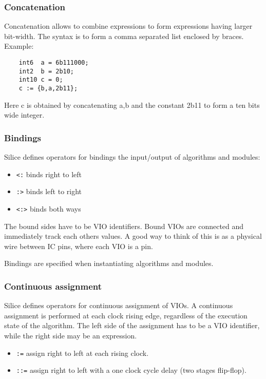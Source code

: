 \documentclass[a4]{article}
\newcommand\todo[1]{{\color{magenta}\textbf{TODO:} #1}}
\newcommand\silice{Silice}
\begin{document}
\subsubsection{Concatenation}

Concatenation allows to combine expressions to form expressions having larger bit-width.
The syntax is to form a comma separated list enclosed by braces.  Example:
\begin{verbatim}
	int6  a = 6b111000;
	int2  b = 2b10;
	int10 c = 0;
	c := {b,a,2b11};
\end{verbatim}

Here c is obtained by concatenating a,b and the constant 2b11 to form a ten bits wide integer.

\subsubsection{Bindings}
\label{sec:bindings}

\silice{} defines operators for bindings the input/output of algorithms and modules:
\begin{itemize}
	\item \texttt{<:} binds right to left
	\item \texttt{:>} binds left to right
	\item \texttt{<:>} binds both ways %
\end{itemize}

The bound sides have to be VIO identifiers. 
Bound VIOs are connected and immediately track each others values.
A good way to think of this is as a physical wire between IC pins, where each VIO is a pin.

Bindings are specified when instantiating algorithms and modules.

\subsubsection{Continuous assignment}
\label{sec:contassign}

\silice{} defines operators for continuous assignment of VIOs.
A continuous assignment is performed at each clock rising edge, regardless of the 
execution state of the algorithm. The left side of the assignment has to be a VIO identifier,
while the right side may be an expression.
\begin{itemize}
\item \texttt{:=} assign right to left at each rising clock.
\item \texttt{::=} assign right to left with a one clock cycle delay (two stages flip-flop).
\end{itemize}
\end{document}
